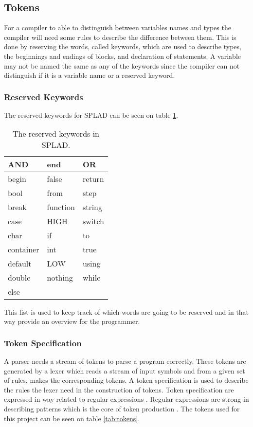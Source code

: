\subsection{Tokens}
For a compiler to able to distinguish between variables names and types the compiler will need some rules to describe the difference between them. This is done by reserving the words, called keywords, which are used to describe types, the beginnings and endings of blocks, and declaration of statements. A variable may not be named the same as any of the keywords since the compiler can not distinguish if it is a variable name or a reserved keyword.

\subsubsection{Reserved Keywords}
The reserved keywords for SPLAD can be seen on table \ref{tab:keywords}.

\begin{table}[H]
	\begin{tabular}{|l|l|l|}
		\hline
		AND			&	end			&	OR		\\ \hline
		begin 		&	false		&	return	\\ \hline
		bool 		&	from		&	step	\\ \hline
		break 		&	function	&	string	\\ \hline
		case 		&	HIGH		&	switch	\\ \hline
		char 		&	if			&	to		\\ \hline
		container 	&	int			&	true	\\ \hline
		default 	&	LOW			&	using	\\ \hline
		double 		&	nothing		&	while	\\ \hline
		else 		&	~			&	~		\\ \hline
	\end{tabular}
	\caption{The reserved keywords in SPLAD.}
	\label{tab:keywords}
\end{table}

This list is used to keep track of which words are going to be reserved and in that way provide an overview for the programmer. 

\subsubsection{Token Specification}
A parser needs a stream of tokens to parse a program correctly. These tokens are generated by a lexer which reads a stream of input symbols and from a given set of rules, makes the corresponding tokens. A token specification is used to describe the rules the lexer need in the construction of tokens. Token specification are expressed in way related to regular expressions \citep{sebesta}. Regular expressions are strong in describing patterns which is the core of token production \citep{sipser}. The tokens used for this project can be seen on table \ref{tab:tokens}.

